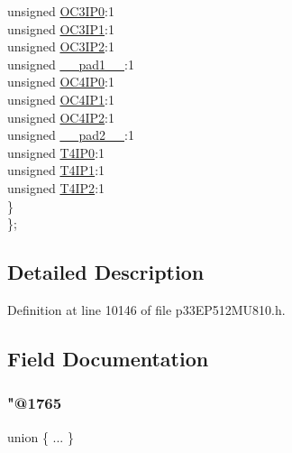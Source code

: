 \begin{DoxyCompactItemize}
\begin{tabbing}
\>\>unsigned \hyperlink{structtag_i_p_c6_b_i_t_s_ae6160e028017ea14470bb1672cce0fa1}{OC3IP0}:1\\
\>\>unsigned \hyperlink{structtag_i_p_c6_b_i_t_s_a918e90a9e680f7b2f33ec14b63a8c44a}{OC3IP1}:1\\
\>\>unsigned \hyperlink{structtag_i_p_c6_b_i_t_s_a1a89e7f69dab5ad6703704810d14f1e9}{OC3IP2}:1\\
\>\>unsigned \hyperlink{structtag_i_p_c6_b_i_t_s_acaf2d0924a107ec6e8d2e31febaf66f9}{\_\_pad1\_\_}:1\\
\>\>unsigned \hyperlink{structtag_i_p_c6_b_i_t_s_ab6293f3b1743b225c9d91d861e4645e6}{OC4IP0}:1\\
\>\>unsigned \hyperlink{structtag_i_p_c6_b_i_t_s_aa0ed3663398c83c0ad10290b6cc6123a}{OC4IP1}:1\\
\>\>unsigned \hyperlink{structtag_i_p_c6_b_i_t_s_abe6ff5f9afc93d0734e89a120a3afc18}{OC4IP2}:1\\
\>\>unsigned \hyperlink{structtag_i_p_c6_b_i_t_s_a4d97cc5f7d51d22fc2bf3eab35c9cb7f}{\_\_pad2\_\_}:1\\
\>\>unsigned \hyperlink{structtag_i_p_c6_b_i_t_s_a02365b8f8d06248b133ecd11fdf2ab2b}{T4IP0}:1\\
\>\>unsigned \hyperlink{structtag_i_p_c6_b_i_t_s_a954a26958f1cb3275dc92907f30cb4e3}{T4IP1}:1\\
\>\>unsigned \hyperlink{structtag_i_p_c6_b_i_t_s_adf37fd156faab704f1204919c768cb1f}{T4IP2}:1\\
\>\} \\
\}; \\

\end{tabbing}\end{DoxyCompactItemize}


\subsection{Detailed Description}


Definition at line 10146 of file p33\+E\+P512\+M\+U810.\+h.



\subsection{Field Documentation}
\mbox{\label{structtag_i_p_c6_b_i_t_s_a651e5e9d95c8a5e0e21b675b80ada7eb}} 
\subsubsection{\texorpdfstring{"@1765}{@1765}}
{\footnotesize\ttfamily union \{ ... \} }

